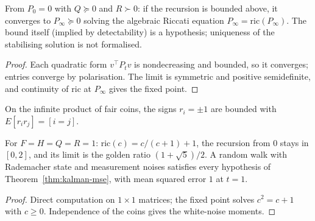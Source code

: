 \begin{theorem}
\label{thm:riccati-steady}
\leanok
{}
From $P_0 = 0$ with $Q\succeq0$ and $R\succ0$: if the recursion is bounded above, it converges to $P_\infty\succeq0$ solving
the algebraic Riccati equation $P_\infty = \mathrm{ric}(P_\infty)$. The bound itself (implied by detectability) is a
hypothesis; uniqueness of the stabilising solution is not formalised.
\end{theorem}
\begin{proof}
\leanok
Each quadratic form $v^\top P_tv$ is nondecreasing and bounded, so it converges; entries converge by polarisation. The
limit is symmetric and positive semidefinite, and continuity of $\mathrm{ric}$ at $P_\infty$ gives the fixed point.
\end{proof}

\begin{definition}
\label{def:white-noise}
\leanok
On the infinite product of fair coins, the signs $r_i = \pm1$ are bounded with $E[r_ir_j] = [i = j]$.
\end{definition}

\begin{theorem}
\label{thm:kalman-witness}
\leanok
{}
For $F = H = Q = R = 1$: $\mathrm{ric}(c) = c/(c+1) + 1$, the recursion from $0$ stays in $[0,2]$, and its limit is the
golden ratio $(1+\sqrt5)/2$. A random walk with Rademacher state and measurement noises satisfies every hypothesis of
Theorem~\ref{thm:kalman-mse}, with mean squared error $1$ at $t = 1$.
\end{theorem}
\begin{proof}
\leanok
Direct computation on $1\times1$ matrices; the fixed point solves $c^2 = c + 1$ with $c\ge0$. Independence of the coins
gives the white-noise moments.
\end{proof}


